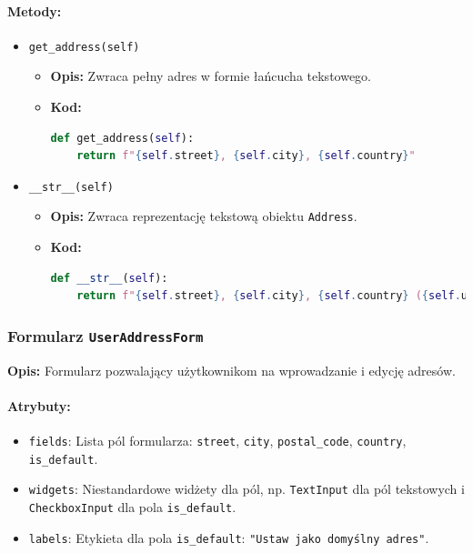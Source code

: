 \documentclass[12pt,a4paper,oneside]{article}
\theoremstyle{definition}
\numberwithin{equation}{section}
\begin{document}
\paragraph{Metody:}
\begin{itemize}
    \item \texttt{get\_address(self)}  
        \begin{itemize}
            \item \textbf{Opis:} Zwraca pełny adres w formie łańcucha tekstowego.
            \item \textbf{Kod:}
            \begin{lstlisting}[language=Python, caption=Metoda get\_address w modelu Address]
def get_address(self):
    return f"{self.street}, {self.city}, {self.country}"
            \end{lstlisting}
        \end{itemize}
    \item \texttt{\_\_str\_\_(self)}  
        \begin{itemize}
            \item \textbf{Opis:} Zwraca reprezentację tekstową obiektu \texttt{Address}.
            \item \textbf{Kod:}
            \begin{lstlisting}[language=Python, caption=Metoda \_\_str\_\_ w modelu Address]
def __str__(self):
    return f"{self.street}, {self.city}, {self.country} ({self.user.email})"
            \end{lstlisting}
        \end{itemize}
\end{itemize}

\subsubsection*{Formularz \texttt{UserAddressForm}}
\textbf{Opis:}  
Formularz pozwalający użytkownikom na wprowadzanie i edycję adresów.

\paragraph{Atrybuty:}
\begin{itemize}
    \item \texttt{fields}: Lista pól formularza: \texttt{street}, \texttt{city}, \texttt{postal\_code}, \texttt{country}, \texttt{is\_default}.
    \item \texttt{widgets}: Niestandardowe widżety dla pól, np. \texttt{TextInput} dla pól tekstowych i \texttt{CheckboxInput} dla pola \texttt{is\_default}.
    \item \texttt{labels}: Etykieta dla pola \texttt{is\_default}: \texttt{"Ustaw jako domyślny adres"}.
\end{itemize}
\end{document}

